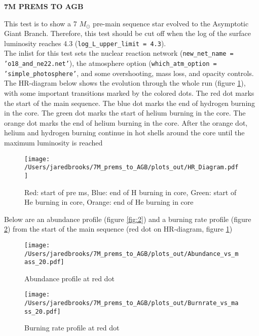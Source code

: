 \documentclass{article}
\begin{document}
	
	\begin{center}
	  \begin{Large}
	    \textbf{7M PREMS TO AGB}\\
	  \end{Large}
	\end{center}

        This test is to show a 7 $M_\odot$ pre-main sequence star evolved to the Asymptotic Giant Branch.  Therefore, this test should be cut off when the log of the surface luminosity reaches 4.3 (\texttt{log\_L\_upper\_limit = 4.3}).\\

        The inlist for this test sets the nuclear reaction network (\texttt{new\_net\_name = 'o18\_and\_ne22.net'}), the atmosphere option (\texttt{which\_atm\_option = 'simple\_photosphere'}, and some overshooting, mass loss, and opacity controls.\\

        The HR-diagram below shows the evolution through the whole run (figure \ref{fig:1}), with some important transitions marked by the colored dots.  The red dot marks the start of the main sequence.  The blue dot marks the end of hydrogen burning in the core.  The green dot marks the start of helium burning in the core.  The orange dot marks the end of helium burning in the core.  After the orange dot, helium and hydrogen burning continue in hot shells around the core until the maximum luminosity is reached

        \begin{figure}[H]
          \centering
          \texttt{[image: /Users/jaredbrooks/7M\_prems\_to\_AGB/plots\_out/HR\_Diagram.pdf]}
          \caption{Red: start of pre ms, Blue: end of H burning in core, Green: start of He burning in core, Orange: end of He burning in core}
          \label{fig:1}
        \end{figure}

        \pagebreak

        Below are an abundance profile (figure \ref{fig:2}) and a burning rate profile (figure \ref{fig:3}) from the start of the main sequence (red dot on HR-diagram, figure \ref{fig:1})

        \begin{figure}[H]
          \begin{minipage}[b]{0.5\linewidth}
	    \centering
	    \texttt{[image: /Users/jaredbrooks/7M\_prems\_to\_AGB/plots\_out/Abundance\_vs\_mass\_20.pdf]}
	    \caption{Abundance profile at red dot}
	    \label{fig:2}
          \end{minipage}
          \hspace{0cm}
          \begin{minipage}[b]{0.5\linewidth}
            \centering
            \texttt{[image: /Users/jaredbrooks/7M\_prems\_to\_AGB/plots\_out/Burnrate\_vs\_mass\_20.pdf]}
            \caption{Burning rate profile at red dot}
            \label{fig:3}
          \end{minipage}
	\end{figure}
\end{document}
